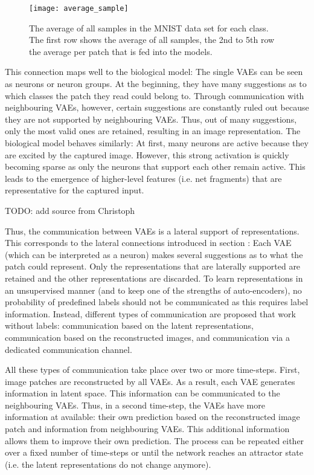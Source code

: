 \begin{figure}[h]
    \centering
    \texttt{[image: average\_sample]}
    \caption[Average sample of the MNIST data set per class]{The average of all samples in the MNIST data set for each class. The first row shows the average of all samples, the 2nd to 5th row the average per patch that is fed into the models.}
\end{figure}

This connection maps well to the biological model: The single VAEs can be seen as neurons or neuron groups. At the beginning, they have many suggestions as to which classes the patch they read could belong to. Through communication with neighbouring VAEs, however, certain suggestions are constantly ruled out because they are not supported by neighbouring VAEs. Thus, out of many suggestions, only the most valid ones are retained, resulting in an image representation. The biological model behaves similarly: At first, many neurons are active because they are excited by the captured image. However, this strong activation is quickly becoming sparse as only the neurons that support each other remain active. This leads to the emergence of higher-level features (i.e. net fragments) that are representative for the captured input.


TODO: add source from Christoph


Thus, the communication between VAEs is a lateral support of representations. This corresponds to the lateral connections introduced in section : Each VAE (which can be interpreted as a neuron) makes several suggestions as to what the patch could represent. Only the representations that are laterally supported are retained and the other representations are discarded. To learn representations in an unsupervised manner (and to keep one of the strengths of auto-encoders), no probability of predefined labels should not be communicated as this requires label information. Instead, different types of communication are proposed that work without labels: communication based on the latent representations, communication based on the reconstructed images, and communication via a dedicated communication channel.

All these types of communication take place over two or more time-steps. First, image patches are reconstructed by all VAEs. As a result, each VAE generates information in latent space. This information can be communicated to the neighbouring VAEs. Thus, in a second time-step, the VAEs have more information at available: their own prediction based on the reconstructed image patch and information from neighbouring VAEs. This additional information allows them to improve their own prediction. The process can be repeated either over a fixed number of time-steps or until the network reaches an attractor state (i.e. the latent representations do not change anymore).


